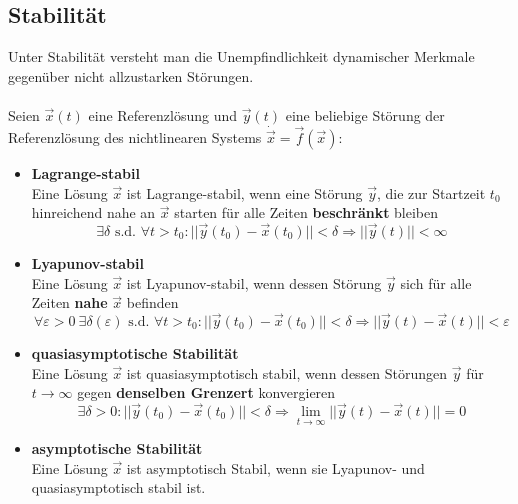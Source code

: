 \documentclass{article}
\begin{document}
\subsection{Stabilität}
Unter Stabilität versteht man die Unempfindlichkeit dynamischer Merkmale gegenüber nicht allzustarken Störungen.\\
\\
Seien $\vec{x}(t)$ eine Referenzlösung und $\vec{y}(t)$ eine beliebige Störung der Referenzlösung des nichtlinearen Systems $\dot{\vec{x}} = \vec{f}(\vec{x})$:
	\begin{itemize}
		\item \textbf{Lagrange-stabil}\\
		Eine Lösung $\vec{x}$ ist Lagrange-stabil, wenn eine Störung $\vec{y}$, die zur Startzeit $t_0$ hinreichend nahe an $\vec{x}$ starten für alle Zeiten \textbf{beschränkt} bleiben
			\begin{equation}
				\exists \delta \text{ s.d. } \forall t > t_0: ||\vec{y}(t_0) - \vec{x}(t_0)|| < \delta \Rightarrow ||\vec{y}(t)|| < \infty
			\end{equation}
		
		
		\item \textbf{Lyapunov-stabil}\\
		Eine Lösung $\vec{x}$ ist Lyapunov-stabil, wenn dessen Störung $\vec{y}$ sich für alle Zeiten \textbf{nahe} $\vec{x}$ befinden
			\begin{equation}
				\forall \varepsilon > 0 \ \exists \delta(\varepsilon) \text{ s.d. } \forall t > t_0: ||\vec{y}(t_0) - \vec{x}(t_0)|| < \delta \Rightarrow ||\vec{y}(t) - \vec{x}(t)|| < \varepsilon
			\end{equation}
		
		
		\item \textbf{quasiasymptotische Stabilität}\\
		Eine Lösung $\vec{x}$ ist quasiasymptotisch stabil, wenn dessen Störungen $\vec{y}$ für $t\to\infty$ gegen \textbf{denselben Grenzert} konvergieren
			\begin{equation}
				\exists \delta > 0 : ||\vec{y}(t_0) - \vec{x}(t_0)|| < \delta \Rightarrow \lim_{t \to \infty} ||\vec{y}(t) - \vec{x}(t)|| = 0
			\end{equation}
		
		
		\item \textbf{asymptotische Stabilität}\\
		Eine Lösung $\vec{x}$ ist asymptotisch Stabil, wenn sie Lyapunov- und quasiasymptotisch stabil ist.
		

\end{itemize}
\end{document}
